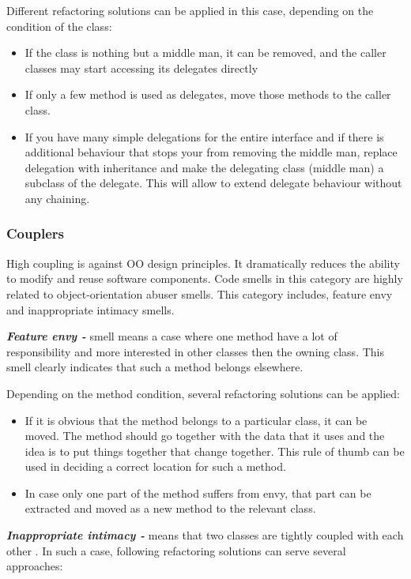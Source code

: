 Different refactoring solutions can be applied in this case, depending on the condition of the class:

\begin{itemize}
\item If the class is nothing but a middle man, it can be removed, and the caller classes may start accessing its delegates directly
\item If only a few method is used as delegates, move those methods to the caller class.
\item If you have many simple delegations for the entire interface and if there is additional behaviour that stops your from removing the middle man, replace delegation with inheritance and make the delegating class (middle man) a subclass of the delegate. This will allow to extend delegate behaviour without any chaining.
\end{itemize} 

\subsubsection*{Couplers}
High coupling is against \gls{OO} design principles. It dramatically reduces the ability to modify and reuse software components. Code smells in this category are highly related to object-orientation abuser smells. This category includes, feature envy and inappropriate intimacy smells.

\textit{\textbf{Feature envy -}} smell means a case where one method have a lot of responsibility and more interested in other classes then the owning class. This smell clearly indicates that such a method belongs elsewhere. 

Depending on the method condition, several refactoring solutions can be applied:

\begin{itemize}
\item If it is obvious that the method belongs to a particular class, it can be moved. The method should go together with the data that it uses and the idea is to put things together that change together. This rule of thumb can be used in deciding a correct location for such a method.
\item In case only one part of the method suffers from envy, that part can be extracted and moved as a new method to the relevant class.
\end{itemize}
 
\textit{\textbf{Inappropriate intimacy -}} means that two classes are tightly coupled with each other \cite{mantylaTaxonomy}. In such a case, following refactoring solutions can serve several approaches:

